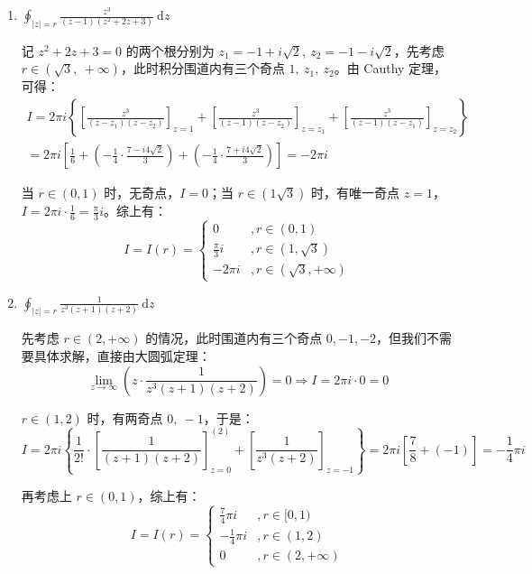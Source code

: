 \documentclass[UTF8]{report}
\theoremstyle{MyLineTheoremStyle} %
\theoremstyle{MyBlockTheoremStyle} %
\theoremstyle{MySubsubsectionStyle} %
\begin{document}
\begin{enumerate}
\item $\displaystyle \oint_{| z | = r} \frac{z^3}{(z - 1)(z^2 + 2z +3)} \ \mathrm{d}z $

记 $z^2 + 2z + 3 = 0$ 的两个根分别为 $z_1 = -1 + i\sqrt{2} ,\ z_2 = -1 - i\sqrt{2} $，先考虑 $r \in (\sqrt{3},\ +\infty)$，此时积分围道内有三个奇点 $1,\ z_1,\ z_2$。由 Cauthy 定理，可得：
\begin{gather}
I = 2 \pi i \left\{ \left[\frac{z^3}{(z - z_1)(z - z_2)}\right]_{z = 1} + \left[\frac{z^3}{(z - 1)(z - z_2)}\right]_{z = z_1} + \left[\frac{z^3}{(z - 1)(z - z_1)}\right]_{z = z_2}  \right\} \\ 
= 2 \pi i \left[ \frac{1}{6} + \left( -\frac{1}{4}\cdot \frac{7 - i4 \sqrt{2} }{3} \right) + \left( -\frac{1}{4}\cdot \frac{7 + i4 \sqrt{2} }{3} \right)  \right] = - 2\pi i
\end{gather}

当 $r \in (0, 1)$ 时，无奇点，$I = 0$；当 $r \in (1 \sqrt{3} )$ 时，有唯一奇点 $z =1$，$I = 2 \pi i \cdot \frac{1}{6} = \frac{\pi}{3}i$。综上有：
\begin{equation}
I = I(r) = 
\begin{cases}
    0 &, r \in (0, 1) \\ 
    \displaystyle \frac{\pi}{3}i &, r \in (1, \sqrt{3}) \\ 
    -2\pi i &, r \in (\sqrt{3}, +\infty)
\end{cases}
\end{equation}

\item $\displaystyle \oint_{| z | = r} \frac{1}{z^3(z + 1)(z + 2)}  \ \mathrm{d}z $

先考虑 $r \in (2 , +\infty)$ 的情况，此时围道内有三个奇点 $0, -1, -2$，但我们不需要具体求解，直接由大圆弧定理：
\begin{equation}
\lim_{z \to \infty}  \left(z \cdot  \frac{1}{z^3(z + 1)(z + 2)} \right) = 0  \Longrightarrow I = 2 \pi i \cdot 0 = 0
\end{equation}

$r \in (1 ,2)$ 时，有两奇点 $0,\ -1$，于是：
\begin{equation}
I = 2 \pi i \left\{ \frac{1}{2!}\cdot \left[ \frac{1}{(z + 1)(z + 2)} \right]^{(2)}_{z = 0} + \left[ \frac{1}{z^3(z + 2)} \right]_{z = -1}\right\} = 2 \pi i \left[ \frac{7}{8} + (-1) \right] = -\frac{1}{4} \pi i
\end{equation}

再考虑上 $r \in (0, 1)$，综上有：
\begin{equation}
I = I(r) = 
\begin{cases}
    \displaystyle \frac{7}{4} \pi i &, r \in [0, 1) \\ 
    \displaystyle -\frac{1}{4} \pi i &, r \in (1, 2) \\ 
    0 &, r \in (2, +\infty)
\end{cases}
\end{equation}

\end{enumerate}
\end{document}
